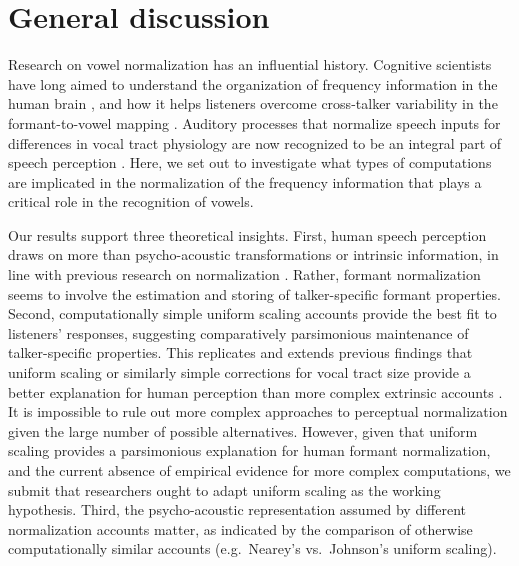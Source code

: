 \documentclass[preprint]{JASA}
\begin{document}
\section{General discussion}\label{sec:G-D}

Research on vowel normalization has an influential history. Cognitive scientists have long aimed to understand the organization of frequency information in the human brain \citep{stevens-volkmann1940, siegel1965}, and how it helps listeners overcome cross-talker variability in the formant-to-vowel mapping \citep[e.g.,][]{joos1948, fant1975, nordstrom-lindblom1975}. Auditory processes that normalize speech inputs for differences in vocal tract physiology are now recognized to be an integral part of speech perception \citep{mcmurray-jongman2011, johnson-sjerps2021, xie2023}. Here, we set out to investigate what types of computations are implicated in the normalization of the frequency information that plays a critical role in the recognition of vowels.

Our results support three theoretical insights. First, human speech perception draws on more than psycho-acoustic transformations or intrinsic information, in line with previous research on normalization \citep{nearey1989, ladefoged-broadbent1957, adank2004}. Rather, formant normalization seems to involve the estimation and storing of talker-specific formant properties. Second, computationally simple uniform scaling accounts provide the best fit to listeners' responses, suggesting comparatively parsimonious maintenance of talker-specific properties. This replicates and extends previous findings that uniform scaling or similarly simple corrections for vocal tract size provide a better explanation for human perception than more complex extrinsic accounts \citep{barreda2021, richter2017}. It is impossible to rule out more complex approaches to perceptual normalization given the large number of possible alternatives. However, given that uniform scaling provides a parsimonious explanation for human formant normalization, and the current absence of empirical evidence for more complex computations, we submit that researchers ought to adapt uniform scaling as the working hypothesis. Third, the psycho-acoustic representation assumed by different normalization accounts matter, as indicated by the comparison of otherwise computationally similar accounts (e.g.~Nearey's vs.~Johnson's uniform scaling).
\end{document}
